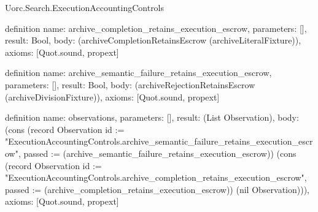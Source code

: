 \begin{lexlean}{Uorc.Search.ExecutionAccountingControls}
\begin{semanticmodule}
definition{
  name: archive_completion_retains_execution_escrow,
  parameters: [],
  result: Bool,
  body: (archiveCompletionRetainsEscrow (archiveLiteralFixture)),
  axioms: [Quot.sound, propext]
}

definition{
  name: archive_semantic_failure_retains_execution_escrow,
  parameters: [],
  result: Bool,
  body: (archiveRejectionRetainsEscrow (archiveDivisionFixture)),
  axioms: [Quot.sound, propext]
}

definition{
  name: observations,
  parameters: [],
  result: (List Observation),
  body: (cons (record Observation {id := "ExecutionAccountingControls.archive_semantic_failure_retains_execution_escrow", passed := (archive_semantic_failure_retains_execution_escrow)}) (cons (record Observation {id := "ExecutionAccountingControls.archive_completion_retains_execution_escrow", passed := (archive_completion_retains_execution_escrow)}) (nil Observation))),
  axioms: [Quot.sound, propext]
}
\end{semanticmodule}
\end{lexlean}
